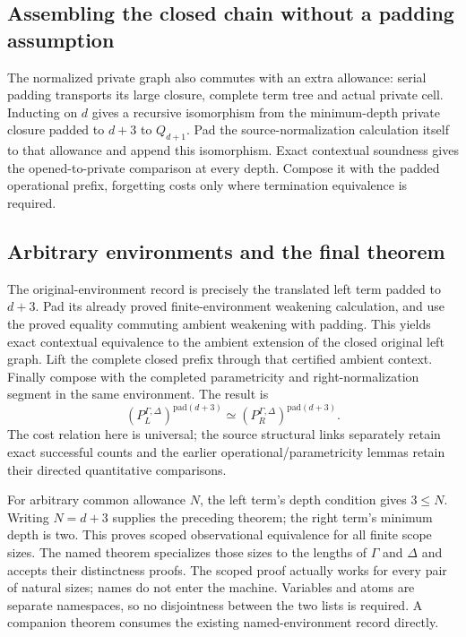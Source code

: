 \subsection{Assembling the closed chain without a padding assumption}
The normalized private graph also commutes with an extra allowance:
serial padding transports its large closure, complete term tree and actual
private cell. Inducting on $d$ gives a recursive isomorphism from the
minimum-depth private closure padded to $d+3$ to $Q_{d+1}$.
Pad the source-normalization calculation itself to that allowance and
append this isomorphism. Exact contextual soundness gives the opened-to-private
comparison at every depth. Compose it with the padded operational prefix,
forgetting costs only where termination equivalence is required.

\subsection{Arbitrary environments and the final theorem}
The original-environment record is precisely the translated left term padded
to $d+3$. Pad its already proved finite-environment weakening calculation,
and use the proved equality commuting ambient weakening with padding.
This yields exact contextual equivalence to the ambient extension of the
closed original left graph. Lift the complete closed prefix through that
certified ambient context. Finally compose with the completed parametricity
and right-normalization segment in the same environment. The result is
\[
 (P_L^{\Gamma,\Delta})^{\mathrm{pad}(d+3)}
 \simeq
 (P_R^{\Gamma,\Delta})^{\mathrm{pad}(d+3)}.
\]
The cost relation here is universal; the source structural links separately
retain exact successful counts and the earlier operational/parametricity
lemmas retain their directed quantitative comparisons.

For arbitrary common allowance $N$, the left term's depth condition gives
$3\leq N$. Writing $N=d+3$ supplies the preceding theorem; the right term's
minimum depth is two. This proves scoped observational equivalence for all
finite scope sizes. The named theorem specializes those sizes to the lengths
of $\Gamma$ and $\Delta$ and accepts their distinctness proofs. The scoped
proof actually works for every pair of natural sizes; names do not enter
the machine. Variables and atoms are separate namespaces, so no disjointness
between the two lists is required. A companion theorem consumes the existing
named-environment record directly.


